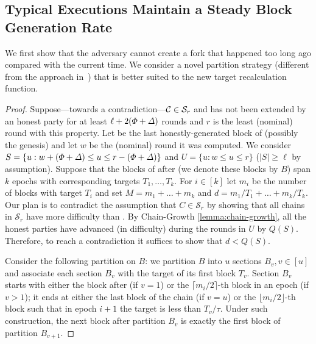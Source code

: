 \subsection{Typical Executions Maintain a Steady Block Generation Rate}

We first show that the adversary cannot create a fork that happened too long ago compared with the current time.
%
We consider a novel partition strategy (different from the approach in~\cite{EPRINT:GarKiaLeo20}) that is better suited to the new target recalculation function.

\lemmanostalechains

\begin{proof}
    Suppose---towards a contradiction---$\mathcal{C} \in \mathcal{S}_r$ and has not been extended by an honest party for at least $\ell + 2(\varPhi + \varDelta)$ rounds and $r$ is the least (nominal) round with this property.
    Let \block be the last honestly-generated block of \chain (possibly the genesis) and let $w$ be the (nominal) round it was computed.
    We consider $S = \{u : w + (\varPhi + \varDelta) \le u \le r - (\varPhi + \varDelta) \}$ and $U = \{u : w \le u \le r \}$ ($|S| \ge \ell$ by assumption).
    Suppose that the blocks of \chain after \block (we denote these blocks by $B$) span $k$ epochs with corresponding targets $T_1, \ldots , T_k$.
    For $i \in [k]$ let $m_i$ be the number of blocks with target $T_i$ and set $M = m_1 + \ldots + m_k$ and $d = m_1 / T_1 + \ldots + m_k / T_k$.
    Our plan is to contradict the assumption that $C \in \mathcal{S}_r$ by showing that all chains in $\mathcal{S}_r$ have more difficulty than \chain.
    By Chain-Growth \cref{lemma:chain-growth}, all the honest parties have advanced (in difficulty) during the rounds in $U$ by $Q(S)$.
    Therefore, to reach a contradiction it suffices to show that $d < Q(S)$.

    Consider the following partition on $B$: we partition $B$ into $u$ sections $B_v, v \in [u]$ and associate each section $B_v$ with the target of its first block $T_v$.
    Section $B_v$ starts with either the block after \block (if $v = 1$) or the $\lceil m_i / 2 \rceil$-th block in an epoch (if $v > 1$); it ends at either the last block of the chain (if $v = u$) or the $\lfloor m_i / 2 \rfloor$-th block such that in epoch $i + 1$ the target is less than $T_v / \tau$.
    Under such construction, the next block after partition $B_v$ is exactly the first block of partition $B_{v + 1}$.


\end{proof}
